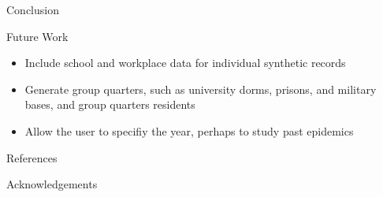 \documentclass[final]{beamer}
\newlength{\onecolwid}
\begin{document}
\begin{frame}[t]
\begin{columns}[t]
\begin{column}{\onecolwid}
\begin{block}{Conclusion}
\end{block}


\begin{block}{Future Work}
\begin{itemize}
\item Include school and workplace data for individual synthetic records
\item Generate group quarters, such as university dorms, prisons, and military bases, and group quarters residents
\item Allow the user to specifiy the year, perhaps to study past epidemics
\end{itemize}

\end{block}


\begin{block}{References}

\tiny{
\vspace{0.75in}}

\end{block}



\begin{block}{Acknowledgements}

\small{} \\

\end{block}


\end{column}
\end{columns}
\end{frame}
\end{document}
